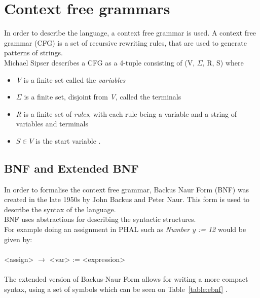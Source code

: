\section{Context free grammars}\label{sec:cfg}
In order to describe the language, a context free grammar is used. A context free grammar (CFG) is a set of recursive rewriting rules, that are used to generate patterns of strings.\\
Michael Sipser describes a CFG as a 4-tuple consisting of (V, $\Sigma$, R, S) where
\begin{itemize}
    \item \textit{V} is a finite set called the \textit{variables}
    \item $\Sigma$ is a finite set, disjoint from \textit{V}, called the terminals
    \item \textit{R} is a finite set of \textit{rules}, with each rule being a variable and a string of variables and terminals
    \item $S \in V$ is the start variable \cite{sipser}.
\end{itemize}

\subsection{BNF and Extended BNF}\label{subsec:bnfEbnf}
In order to formalise the context free grammar, Backus Naur Form (BNF) was created in the late 1950s by John Backus and Peter Naur. This form is used to describe the syntax of the language.\\
BNF uses abstractions for describing the syntactic structures. \\
For example doing an assignment in PHAL such as \textit{Number y := 12} would be given by:
\\\\
<assign> $\xrightarrow{}$ <var> := <expression>
\\\\
The extended version of Backus-Naur Form allows for writing a more compact syntax, using a set of symbols which can be seen on Table~\ref{table:ebnf} \cite{ISOIEC14977}. 


